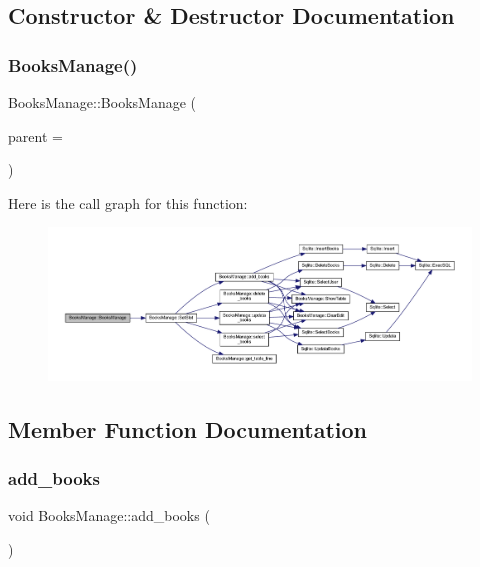 \subsection{Constructor \& Destructor Documentation}
\mbox{\label{class_books_manage_adc44f2312ab4d2cd48868ff923fa8861}} 
\subsubsection{\texorpdfstring{BooksManage()}{BooksManage()}}
{\footnotesize\ttfamily Books\+Manage\+::\+Books\+Manage (\begin{DoxyParamCaption}\item[{Q\+Widget $\ast$}]{parent = {} }\end{DoxyParamCaption})\hspace{0.3cm}{\ttfamily [explicit]}}

Here is the call graph for this function\+:
\nopagebreak
\begin{figure}[H]
\begin{center}
\leavevmode
\includegraphics[width=350pt]{class_books_manage_adc44f2312ab4d2cd48868ff923fa8861_cgraph}
\end{center}
\end{figure}


\subsection{Member Function Documentation}
\mbox{\label{class_books_manage_a39c7bdd07e0af93379e1270becd8525c}} 
\subsubsection{\texorpdfstring{add\_books}{add\_books}}
{\footnotesize\ttfamily void Books\+Manage\+::add\+\_\+books (\begin{DoxyParamCaption}{ }\end{DoxyParamCaption})\hspace{0.3cm}{\ttfamily [slot]}}

